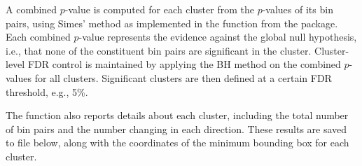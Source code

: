 \documentclass{report}\usepackage[]{graphicx}\usepackage[usenames,dvipsnames]{color}
\newcommand{\hlnum}[1]{\textcolor[rgb]{0.816,0.125,0.439}{#1}}%
\newcommand{\hlopt}[1]{\textcolor[rgb]{0,0,0}{#1}}%
\newcommand{\hlstd}[1]{\textcolor[rgb]{0.251,0.251,0.251}{#1}}%
\newcommand{\hlkwb}[1]{\textcolor[rgb]{0,0,0}{#1}}%
\newcommand{\hlkwd}[1]{\textcolor[rgb]{0.878,0.439,0.125}{#1}}%
\newenvironment{knitrout}{}{} %
\begin{document}
A combined $p$-value is computed for each cluster from the $p$-values of its bin pairs, using Simes' method \cite{simes1986} as implemented in the  function from the  package.
Each combined $p$-value represents the evidence against the global null hypothesis, i.e., that none of the constituent bin pairs are significant in the cluster.
Cluster-level FDR control is maintained by applying the BH method on the combined $p$-values for all clusters.
Significant clusters are then defined at a certain FDR threshold, e.g., 5\%.

\begin{knitrout}
\color{fgcolor}
\end{knitrout}

The  function also reports details about each cluster, including the total number of bin pairs and the number changing in each direction.
These results are saved to file below, along with the coordinates of the minimum bounding box for each cluster.
\end{document}
